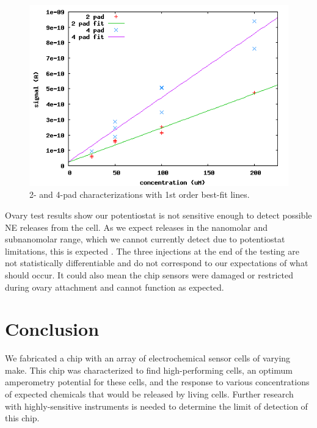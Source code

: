 \documentclass{report}
\begin{document}
\begin{figure}
\centering
\includegraphics[width=\linewidth]{figures/char.png}
\caption{2- and 4-pad characterizations with 1st order best-fit lines.}
\label{char}
\end{figure}

Ovary test results show our potentiostat is not sensitive enough to detect possible NE releases from the cell. As we expect releases in the nanomolar and subnanomolar range, which we cannot currently detect due to potentiostat limitations, this is expected \cite{amperometry-review}. The three injections at the end of the testing are not statistically differentiable and do not correspond to our expectations of what should occur. It could also mean the chip sensors were damaged or restricted during ovary attachment and cannot function as expected.

\chapter{Conclusion}

We fabricated a chip with an array of electrochemical sensor cells of varying make. This chip was characterized to find high-performing cells, an optimum amperometry potential for these cells, and the response to various concentrations of expected chemicals that would be released by living cells. Further research with highly-sensitive instruments is needed to determine the limit of detection of this chip.

{}

\end{document}
